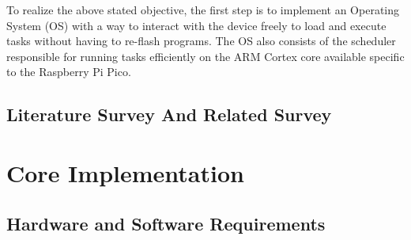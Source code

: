 \documentclass[12pt]{report}
\begin{document}
To realize the above stated objective, the first step is to implement an
Operating System (OS) with a way to interact with the device freely to 
load and execute tasks without having to re-flash programs. The OS also 
consists of the scheduler responsible for running tasks efficiently on the 
ARM Cortex core available specific to the Raspberry Pi Pico.



\pagebreak

\section{Literature Survey And Related Survey} 


\pagebreak

\chapter{Core Implementation}


\pagebreak

\section{Hardware and Software Requirements}

\end{document}
